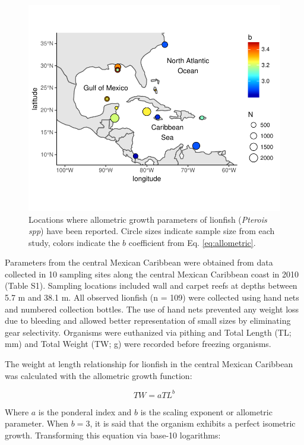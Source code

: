 \documentclass[fleqn,10pt,lineno]{wlpeerj} %
\begin{document}
\begin{figure}
\centering
\includegraphics{Manuscript_files/figure-latex/unnamed-chunk-1-1.pdf}
\caption{\label{fig:map}Locations where allometric growth parameters of
lionfish (\emph{Pterois spp}) have been reported. Circle sizes indicate
sample size from each study, colors indicate the \(b\) coefficient from
Eq. \ref{eq:allometric}.}
\end{figure}

Parameters from the central Mexican Caribbean were obtained from data
collected in 10 sampling sites along the central Mexican Caribbean coast
in 2010 (Table S1). Sampling locations included wall and carpet reefs at
depths between 5.7 m and 38.1 m. All observed lionfish (n = 109) were
collected using hand nets and numbered collection bottles. The use of
hand nets prevented any weight loss due to bleeding and allowed better
representation of small sizes by eliminating gear selectivity. Organisms
were euthanized via pithing and Total Length (TL; mm) and Total Weight
(TW; g) were recorded before freezing organisms.

The weight at length relationship for lionfish in the central Mexican
Caribbean was calculated with the allometric growth function:

\begin{equation}
\label{eq:allometric}
TW = aTL^b
\end{equation}

Where \(a\) is the ponderal index and \(b\) is the scaling exponent or
allometric parameter. When \(b = 3\), it is said that the organism
exhibits a perfect isometric growth. Transforming this equation via
base-10 logarithms:
\end{document}
